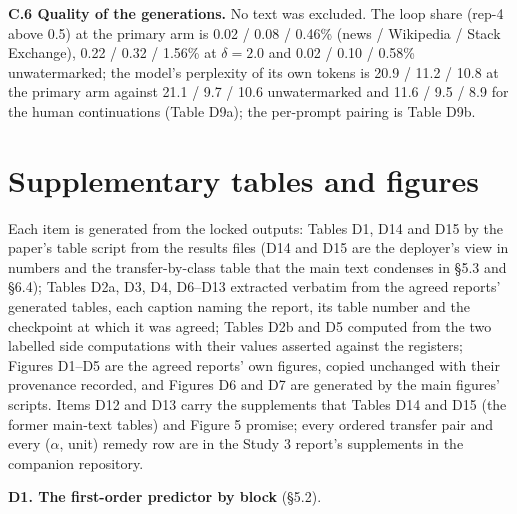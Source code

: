 \documentclass[11pt,letterpaper]{article}
\begin{document}
\textbf{C.6 Quality of the generations.} No text was excluded. The loop share (rep-4 above 0.5) at the primary arm is 0.02 / 0.08 / 0.46\% (news / Wikipedia / Stack Exchange), 0.22 / 0.32 / 1.56\% at \(\delta = 2.0\) and 0.02 / 0.10 / 0.58\% unwatermarked; the model's perplexity of its own tokens is 20.9 / 11.2 / 10.8 at the primary arm against 21.1 / 9.7 / 10.6 unwatermarked and 11.6 / 9.5 / 8.9 for the human continuations (Table D9a); the per-prompt pairing is Table D9b.

\hypertarget{supplementary-tables-and-figures}{%
\section{Supplementary tables and figures}\label{supplementary-tables-and-figures}}

Each item is generated from the locked outputs: Tables D1, D14 and D15 by the paper's table script from the results files (D14 and D15 are the deployer's view in numbers and the transfer-by-class table that the main text condenses in \S{}5.3 and \S{}6.4); Tables D2a, D3, D4, D6--D13 extracted verbatim from the agreed reports' generated tables, each caption naming the report, its table number and the checkpoint at which it was agreed; Tables D2b and D5 computed from the two labelled side computations with their values asserted against the registers; Figures D1--D5 are the agreed reports' own figures, copied unchanged with their provenance recorded, and Figures D6 and D7 are generated by the main figures' scripts. Items D12 and D13 carry the supplements that Tables D14 and D15 (the former main-text tables) and Figure 5 promise; every ordered transfer pair and every (\ensuremath{\alpha}, unit) remedy row are in the Study 3 report's supplements in the companion repository.

\textbf{D1. The first-order predictor by block} (\S{}5.2).
\end{document}
